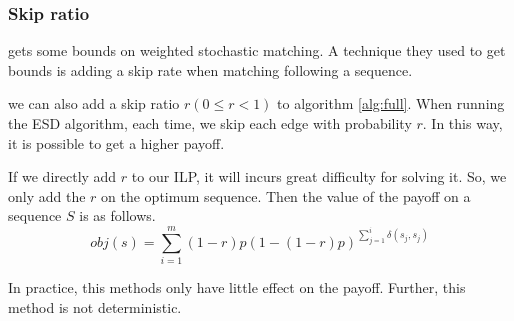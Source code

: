 \documentclass[letterpaper]{article}
\begin{document}
\subsubsection{Skip ratio}
\cite{bansal2012lp} gets some bounds on weighted stochastic matching.
A technique they used to get bounds is adding a skip rate when matching following a sequence.

we can also add a skip ratio $r (0\leq r<1)$ to algorithm \ref{alg:full}.
When running the ESD algorithm, each time, we skip each edge with probability $r$.
In this way, it is possible to get a higher payoff.

If we directly add $r$ to our ILP, it will incurs great difficulty for solving it.
So, we only add the $r$ on the optimum sequence.
Then the value of the payoff on a sequence $S$ is as follows.
\begin{equation}
obj(s)=\sum_{i=1}^{m}(1-r)p(1-(1-r)p)^{\sum_{j=1}^{i}\delta(s_j,s_j)}
\end{equation} 

In practice, this methods only have little effect on the payoff.
Further, this method is not deterministic.


\newpage


\end{document}
